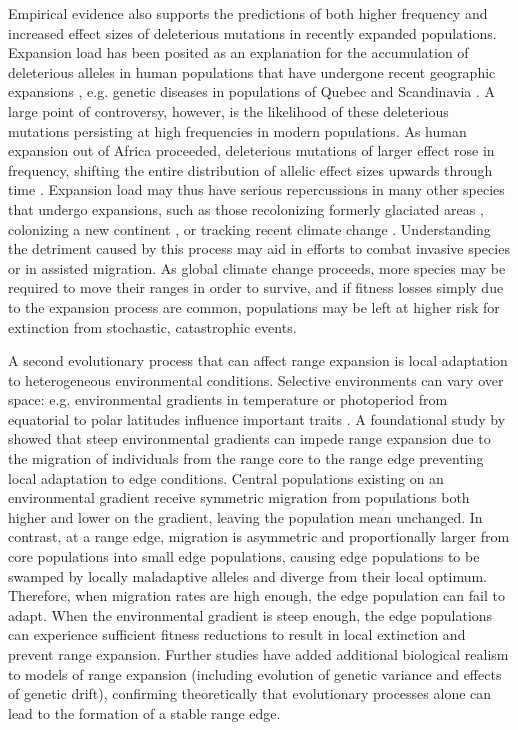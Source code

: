Empirical evidence also supports the predictions of both higher frequency and increased effect sizes of deleterious mutations in recently expanded populations. Expansion load has been posited as an explanation for the accumulation of deleterious alleles in human populations that have undergone recent geographic expansions \citep{Karlsson:2014}, e.g. genetic diseases in populations of Quebec \citep{Scriver:2001, Yotova:2005, Labuda:1997} and Scandinavia \citep{Norio:2003}. A large point of controversy, however, is the likelihood of these deleterious mutations persisting at high frequencies in modern populations. As human expansion out of Africa proceeded, deleterious mutations of larger effect rose in frequency, shifting the entire distribution of allelic effect sizes upwards through time \citep{Henn:2015}. Expansion load may thus have serious repercussions in many other species that undergo expansions, such as those recolonizing formerly glaciated areas \citep{Hewitt:1999}, colonizing a new continent \citep{Sakai:2001}, or tracking recent climate change \citep{Chen:2011}. Understanding the detriment caused by this process may aid in efforts to combat invasive species or in assisted migration. As global climate change proceeds, more species may be required to move their ranges in order to survive, and if fitness losses simply due to the expansion process are common, populations may be left at higher risk for extinction from stochastic, catastrophic events. 

A second evolutionary process that can affect range expansion is local adaptation to heterogeneous environmental conditions. Selective environments can vary over space: e.g. environmental gradients in temperature or photoperiod from equatorial to polar latitudes influence important traits \citep{Conover:1992, Montague:2008}. A foundational study by \citet{Kirkpatrick:1997} showed that steep environmental gradients can impede range expansion due to the migration of individuals from the range core to the range edge preventing local adaptation to edge conditions. Central populations existing on an environmental gradient receive symmetric migration from populations both higher and lower on the gradient, leaving the population mean unchanged. In contrast, at a range edge, migration is asymmetric and proportionally larger from core populations into small edge populations, causing edge populations to be swamped by locally maladaptive alleles and diverge from their local optimum. Therefore, when migration rates are high enough, the edge population can fail to adapt. When the environmental gradient is steep enough, the edge populations can experience sufficient fitness reductions to result in local extinction and prevent range expansion. Further studies \citep{Barton:2001, Polechova:2015} have added additional biological realism to models of range expansion (including evolution of genetic variance and effects of genetic drift), confirming theoretically that evolutionary processes alone can lead to the formation of a stable range edge. 


